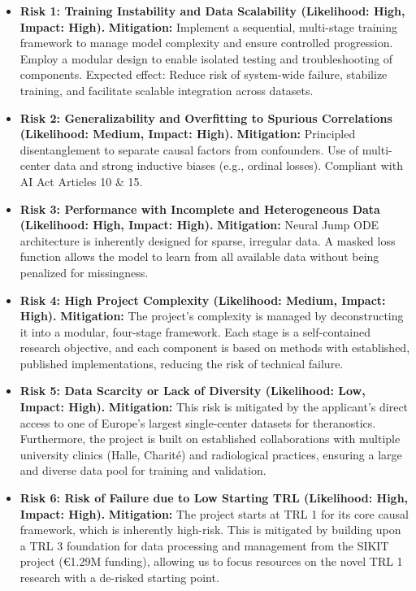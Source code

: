 \documentclass[11pt, a4paper]{article}
\begin{document}
\begin{itemize}
    \item \textbf{Risk 1: Training Instability and Data Scalability (Likelihood: High, Impact: High).}
    \subitem \textbf{Mitigation:} Implement a sequential, multi-stage training framework to manage model complexity and ensure controlled progression. Employ a modular design to enable isolated testing and troubleshooting of components. Expected effect: Reduce risk of system-wide failure, stabilize training, and facilitate scalable integration across datasets.
    \item \textbf{Risk 2: Generalizability and Overfitting to Spurious Correlations (Likelihood: Medium, Impact: High).}
    \subitem \textbf{Mitigation:} Principled disentanglement to separate causal factors from confounders. Use of multi-center data and strong inductive biases (e.g., ordinal losses). Compliant with AI Act Articles 10 \& 15.
    \item \textbf{Risk 3: Performance with Incomplete and Heterogeneous Data (Likelihood: High, Impact: High).}
    \subitem \textbf{Mitigation:} Neural Jump ODE architecture is inherently designed for sparse, irregular data. A masked loss function allows the model to learn from all available data without being penalized for missingness.
    \item \textbf{Risk 4: High Project Complexity (Likelihood: Medium, Impact: High).}
    \subitem \textbf{Mitigation:} The project's complexity is managed by deconstructing it into a modular, four-stage framework. Each stage is a self-contained research objective, and each component is based on methods with established, published implementations, reducing the risk of technical failure.
    \item \textbf{Risk 5: Data Scarcity or Lack of Diversity (Likelihood: Low, Impact: High).}
    \subitem \textbf{Mitigation:} This risk is mitigated by the applicant's direct access to one of Europe's largest single-center datasets for theranostics. Furthermore, the project is built on established collaborations with multiple university clinics (Halle, Charité) and radiological practices, ensuring a large and diverse data pool for training and validation.
    \item \textbf{Risk 6: Risk of Failure due to Low Starting TRL (Likelihood: High, Impact: High).}
    \subitem \textbf{Mitigation:} The project starts at TRL 1 for its core causal framework, which is inherently high-risk. This is mitigated by building upon a TRL 3 foundation for data processing and management from the SIKIT project (€1.29M funding), allowing us to focus resources on the novel TRL 1 research with a de-risked starting point.

\end{itemize}
\end{document}
